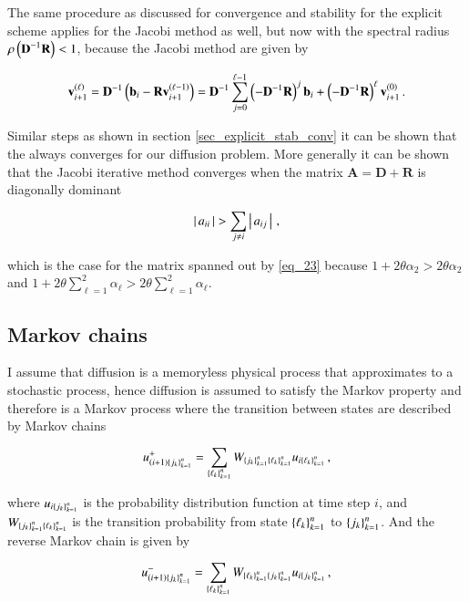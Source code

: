 \documentclass[11pt,english,a4paper]{article}
\begin{document}
\begin{flushleft}
The same procedure as discussed for convergence and stability for the explicit scheme applies for the Jacobi method as well, but now with the spectral radius $\rho\left({\textbf{D}^{-1} \textbf{R}}\right) < 1$, because the Jacobi method are given by 

\begin{align*}
\textbf{v}_{i+1}^{\left({\ell}\right)} = \textbf{D}^{-1}\left({\textbf{b}_i - \textbf{R}\textbf{v}_{i+1}^{\left({\ell-1}\right)}}\right) = \textbf{D}^{-1}\sum_{j=0}^{\ell-1} \left({-\textbf{D}^{-1}\textbf{R}}\right)^j \textbf{b}_i + \left({-\textbf{D}^{-1}\textbf{R}}\right)^\ell\textbf{v}_{i+1}^{(0)} \,.
\end{align*}

Similar steps as shown in section \ref{sec_explicit_stab_conv} it can be shown that the always converges for our diffusion problem. More generally it can be shown that the Jacobi iterative method converges when the matrix $\textbf{A} = \textbf{D}+ \textbf{R}$ is diagonally dominant 

\begin{align*}
\left\vert{\,a_{ii}\,}\right\vert > \sum_{j\neq i} \left\vert{\,a_{ij}\,}\right\vert\,,
\end{align*}

which is the case for the matrix spanned out by \eqref{eq_23} because $1+2\theta \alpha_2 > 2\theta \alpha_2$ and $1+2\theta\sum_{\ell=1}^2 \alpha_{\ell} > 2\theta\sum_{\ell=1}^2 \alpha_\ell$.

\subsection{Markov chains}

I assume that diffusion is a memoryless physical process that approximates to a stochastic process, hence diffusion is assumed to satisfy the Markov property and therefore is a Markov process where the transition between states are described by Markov chains 

\begin{align}
u_{(i+1)\left\lbrace{j_k}\right\rbrace_{k=1}^n}^+ = \sum_{\left\lbrace{\ell_k}\right\rbrace_{k=1}^n} W_{\left\lbrace{j_k}\right\rbrace_{k=1}^n\left\lbrace{\ell_k}\right\rbrace_{k=1}^n} u_{i\left\lbrace{\ell_k}\right\rbrace_{k=1}^n} \,,
\label{eq_38}
\end{align}

where $u_{i\left\lbrace{j_k}\right\rbrace_{k=1}^n}$ is the probability distribution function  at time step $i$, and $W_{\left\lbrace{j_k}\right\rbrace_{k=1}^n\left\lbrace{\ell_k}\right\rbrace_{k=1}^n}$  is the transition probability from state $\left\lbrace{\ell_k}\right\rbrace_{k=1}^n$ to $\left\lbrace{j_k}\right\rbrace_{k=1}^n$. And the reverse Markov chain is given by

\begin{align}
u_{(i+1)\left\lbrace{j_k}\right\rbrace_{k=1}^n}^- = \sum_{\left\lbrace{\ell_k}\right\rbrace_{k=1}^n} W_{\left\lbrace{\ell_k}\right\rbrace_{k=1}^n\left\lbrace{j_k}\right\rbrace_{k=1}^n} u_{i\left\lbrace{j_k}\right\rbrace_{k=1}^n} \,,
\label{eq_39}
\end{align}


\end{flushleft}
\end{document}
